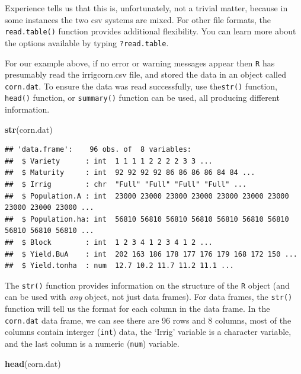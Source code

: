 \documentclass[letterpaper,]{book}
\newenvironment{Shaded}{\begin{snugshade}}{\end{snugshade}}
\newcommand{\KeywordTok}[1]{\textcolor[rgb]{0.13,0.29,0.53}{\textbf{#1}}}
\newcommand{\NormalTok}[1]{#1}
\begin{document}
Experience tells us that this is, unfortunately, not a trivial matter, because in some instances the two csv systems are mixed. For other file formats, the \texttt{read.table()} function provides additional flexibility. You can learn more about the options available by typing \texttt{?read.table}.

For our example above, if no error or warning messages appear then \texttt{R} has presumably read the irrigcorn.csv file, and stored the data in an object called \texttt{corn.dat}. To ensure the data was read successfully, use the\texttt{str()} function, \texttt{head()} function, or \texttt{summary()} function can be used, all producing different information.

\begin{Shaded}
\begin{Highlighting}[]
\KeywordTok{str}\NormalTok{(corn.dat)}
\end{Highlighting}
\end{Shaded}

\begin{verbatim}
## 'data.frame':    96 obs. of  8 variables:
##  $ Variety      : int  1 1 1 1 2 2 2 2 3 3 ...
##  $ Maturity     : int  92 92 92 92 86 86 86 86 84 84 ...
##  $ Irrig        : chr  "Full" "Full" "Full" "Full" ...
##  $ Population.A : int  23000 23000 23000 23000 23000 23000 23000 23000 23000 23000 ...
##  $ Population.ha: int  56810 56810 56810 56810 56810 56810 56810 56810 56810 56810 ...
##  $ Block        : int  1 2 3 4 1 2 3 4 1 2 ...
##  $ Yield.BuA    : int  202 163 186 178 177 176 179 168 172 150 ...
##  $ Yield.tonha  : num  12.7 10.2 11.7 11.2 11.1 ...
\end{verbatim}

The \texttt{str()} function provides information on the structure of the \texttt{R} object (and can be used with \emph{any} object, not just data frames). For data frames, the \texttt{str()} function will tell us the format for each column in the data frame. In the \texttt{corn.dat} data frame, we can see there are 96 rows and 8 columns, most of the columns contain interger (\texttt{int}) data, the `Irrig' variable is a character variable, and the last column is a numeric (\texttt{num}) variable.

\begin{Shaded}
\begin{Highlighting}[]
\KeywordTok{head}\NormalTok{(corn.dat)}
\end{Highlighting}
\end{Shaded}
\end{document}
